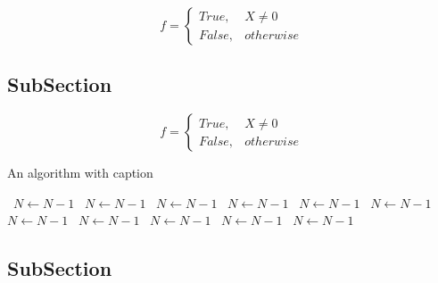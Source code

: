 \documentclass[a4paper]{article}
\begin{document}
\begin{equation}   f =
\begin{cases} True, & X \neq 0\\
False, & otherwise
\end{cases}
\end{equation}

\subsection{SubSection}

\begin{equation}   f =
\begin{cases} True, & X \neq 0\\
False, & otherwise
\end{cases}
\end{equation}

\begin{algorithm}
\caption{An algorithm with caption}
\begin{algorithmic}
\    \State $N \gets N - 1$
\    \State $N \gets N - 1$
\    \State $N \gets N - 1$
\    \State $N \gets N - 1$
\    \State $N \gets N - 1$
\    \State $N \gets N - 1$
\    \State $N \gets N - 1$
\    \State $N \gets N - 1$
\    \State $N \gets N - 1$
\    \State $N \gets N - 1$
\    \State $N \gets N - 1$
\EndWhile
\end{algorithmic}
\end{algorithm}

\subsection{SubSection}
\end{document}
